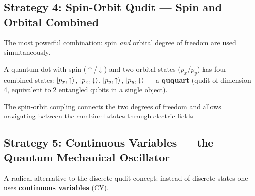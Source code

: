 \subsection{Strategy 4: Spin-Orbit Qudit --- Spin and Orbital Combined}
\label{sec:spin-orbital}

The most powerful combination: spin \emph{and} orbital degree of freedom
are used simultaneously.

A quantum dot with spin ($\uparrow$/$\downarrow$) and
two orbital states ($p_x$/$p_y$) has four combined states:
$\left|p_x,\uparrow\right\rangle$, $\left|p_x,\downarrow\right\rangle$,
$\left|p_y,\uparrow\right\rangle$, $\left|p_y,\downarrow\right\rangle$ ---
a \textbf{ququart} (qudit of dimension 4,
equivalent to 2 entangled qubits in a single object).

The spin-orbit coupling connects the two degrees of freedom
and allows navigating between the combined states
through electric fields.

\begin{center}
\end{center}

\subsection{Strategy 5: Continuous Variables ---
  the Quantum Mechanical Oscillator}
\label{sec:cv}

A radical alternative to the discrete qudit concept:
instead of discrete states one uses
\textbf{continuous variables} (CV).

